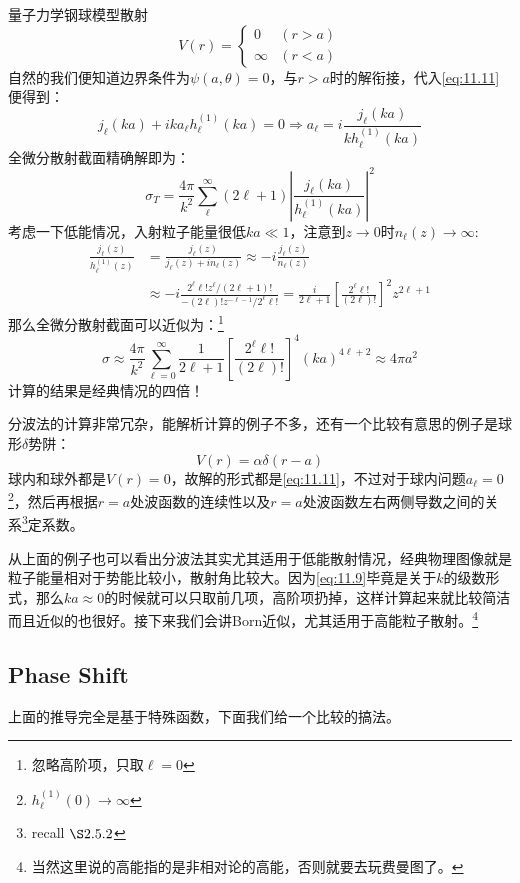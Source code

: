 \documentclass[a4paper,zihao=-4,linespread=1]{ctexrep}
\begin{document}
	\begin{example}{量子力学钢球模型散射}
		\[V(r)=\begin{cases}
			0&(r>a)\\
			\infty &(r<a)
		\end{cases}\]
		自然的我们便知道边界条件为$\psi(a,\theta)=0$，与$r>a$时的解衔接，代入\ref{eq:11.11}便得到：
		\[j_\ell(ka)+ika_\ell h^{(1)}_\ell(ka)=0\Rightarrow a_\ell=i\frac{j_\ell(ka)}{kh_\ell^{(1)}(ka)}\]
		全微分散射截面精确解即为：
		\[\sigma_T=\frac{4\pi}{k^2}\sum_\ell^\infty(2\ell+1)\left|\frac{j_\ell(ka)}{h_\ell^{(1)}(ka)}\right|^2\]
		考虑一下低能情况，入射粒子能量很低$ka\ll1$，注意到$z\to 0$时$n_\ell(z)\to\infty$:
		\begin{equation*}
			\begin{aligned}
				\frac{j_{\ell}(z)}{h_{\ell}^{(1)}(z)} & =\frac{j_{\ell}(z)}{j_{\ell}(z)+i n_{\ell}(z)} \approx-i \frac{j_{\ell}(z)}{n_{\ell}(z)} \\
				& \approx-i \frac{2^{\ell} \ell ! z^{\ell} /(2 \ell+1) !}{-(2 \ell) ! z^{-\ell-1} / 2^{\ell} \ell !}=\frac{i}{2 \ell+1}\left[\frac{2^{\ell} \ell !}{(2 \ell) !}\right]^{2} z^{2 \ell+1}
			\end{aligned}
		\end{equation*}
		那么全微分散射截面可以近似为：\footnote{忽略高阶项，只取$\ell=0$}
		\[\sigma \approx \frac{4 \pi}{k^{2}} \sum_{\ell=0}^{\infty} \frac{1}{2 \ell+1}\left[\frac{2^{\ell} \ell !}{(2 \ell) !}\right]^{4}(k a)^{4 \ell+2}\approx4\pi a^2
		\]
		计算的结果是经典情况的四倍！
	\end{example}
	分波法的计算非常冗杂，能解析计算的例子不多，还有一个比较有意思的例子是球形$\delta$势阱：
	\[V(r)=\alpha\delta(r-a)\]
	球内和球外都是$V(r)=0$，故解的形式都是\ref{eq:11.11}，不过对于球内问题$a_\ell=0$\footnote{$h^{(1)}_\ell(0)\to\infty$}，然后再根据$r=a$处波函数的连续性以及$r=a$处波函数左右两侧导数之间的关系\footnote{recall $\S 2.5.2$}定系数。
	
	从上面的例子也可以看出分波法其实尤其适用于低能散射情况，经典物理图像就是粒子能量相对于势能比较小，散射角比较大。因为\ref{eq:11.9}毕竟是关于$k$的级数形式，那么$ka\approx 0$的时候就可以只取前几项，高阶项扔掉，这样计算起来就比较简洁而且近似的也很好。接下来我们会讲Born近似，尤其适用于高能粒子散射。\footnote{当然这里说的高能指的是非相对论的高能，否则就要去玩费曼图了。}
	
	\subsection{Phase Shift}
	上面的推导完全是基于特殊函数，下面我们给一个比较的搞法。
	
\end{document}
